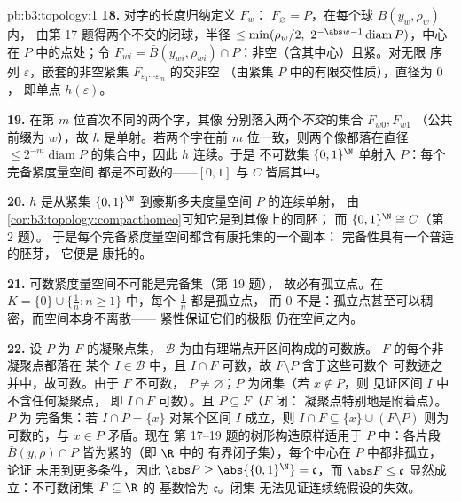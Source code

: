 \begin{solution}{pb:b3:topology:1}
\textbf{18.} 对字的长度归纳定义 $F_w$：
$F_\varnothing = P$，在每个球 $B(y_w, \rho_w)$ 内，
由第 17 题得两个不交的闭球，半径 $\leq
\min(\rho_w/2,\ 2^{-\abs w-1}\operatorname{diam}P)$，中心在
$P$ 中的点处；令 $F_{wi} = \bar B(y_{wi}, \rho_{wi})
\cap P$：非空（含其中心）且紧。对无限
序列 $\varepsilon$，嵌套的非空紧集
$F_{\varepsilon_1\cdots\varepsilon_m}$ 的交非空
（由紧集 $P$ 中的有限交性质），直径为 $0$，
即单点 $h(\varepsilon)$。

\textbf{19.} 在第 $m$ 位首次不同的两个字，其像
分别落入两个\emph{不交}的集合 $F_{w0}, F_{w1}$
（公共前缀为 $w$），故 $h$ 是单射。若两个字在前
$m$ 位一致，则两个像都落在直径 $\leq
2^{-m}\operatorname{diam}P$ 的集合中，因此 $h$ 连续。于是
不可数集 $\{0,1\}^\N$ 单射入 $P$：每个完备紧度量空间
都是不可数的——$[0,1]$ 与 $C$
皆属其中。

\textbf{20.} $h$ 是从紧集 $\{0,1\}^\N$ 到豪斯多夫度量空间 $P$ 的连续单射，
由\cref{cor:b3:topology:compacthomeo}可知它是到其像上的同胚；
而 $\{0,1\}^\N \cong C$（第 2 题）。
于是每个完备紧度量空间都含有康托集的一个副本：
完备性具有一个普适的胚芽，
它便是
康托的。

\textbf{21.} 可数紧度量空间不可能是完备集（第 19 题），
故必有孤立点。在 $K =
\{0\}\cup\{\frac1n : n \geq 1\}$ 中，每个 $\frac1n$ 都是孤立点，
而 $0$ 不是：孤立点甚至可以稠密，而空间本身不离散——
紧性保证它们的极限
仍在空间之内。

\textbf{22.} 设 $P$ 为 $F$ 的凝聚点集，
$\mathcal B$ 为由有理端点开区间构成的可数族。
$F$ 的每个非凝聚点都落在
某个 $I \in \mathcal B$ 中，且 $I \cap F$ 可数，故 $F
\setminus P$ 含于这些可数个
可数迹之并中，故可数。由于 $F$ 不可数，
$P \neq \varnothing$；$P$ 为闭集（若 $x \notin P$，则
见证区间 $I$ 中不含任何凝聚点，
即 $I \cap F$ 可数）。且 $P \subseteq F$（$F$ 闭：
凝聚点特别地是附着点）。$P$ 为
完备集：若 $I \cap P = \{x\}$ 对某个区间 $I$ 成立，则
$I \cap F \subseteq \{x\} \cup (F \setminus P)$ 则为
可数的，与 $x \in P$ 矛盾。现在
第 17--19 题的树形构造原样适用于 $P$ 中：各片段
$\bar B(y, \rho) \cap P$ 皆为紧的（即 $\R$ 中的
有界闭子集），每个中心在 $P$ 中都非孤立，论证
未用到更多条件，因此 $\abs P \geq
\abs{\{0,1\}^\N} = \mathfrak c$，而 $\abs F \leq \mathfrak
c$ 显然成立：不可数闭集 $F \subseteq \R$ 的
基数恰为 $\mathfrak c$。闭集
无法见证连续统假设的失效。


\end{solution}
